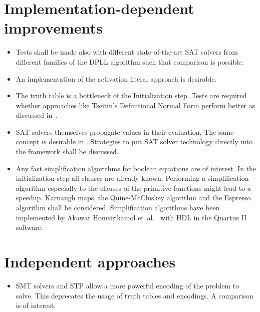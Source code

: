 \section{Implementation-dependent improvements}
%
\begin{itemize}
  \item Tests shall be made also with different state-of-the-art SAT solvers from different families of the DPLL algorithm such that comparison is possible.
  \item An implementation of the activation literal approach is desirable.
  \item The truth table is a bottleneck of the Initialization step. Tests are required whether approaches like Tseitin's Definitional Normal Form perform better as discussed in~\cite{Sat03}.
  \item SAT solvers themselves propagate values in their evaluation. The same concept is desirable in \nltool. Strategies to put SAT solver technology directly into the framework shall be discussed.
  \item Any fast simplification algorithms for boolean equations are of interest. In the initialization step all clauses are already known. Performing a simplification algorithm especially to the clauses of the primitive functions might lead to a speedup. Karnaugh maps, the Quine-McCluskey algorithm and the Espresso algorithm shall be considered. Simplification algorithms have been implemented by Akawat Homsirikamol et~al.~\cite{Cry04} with HDL in the Quartus II software.
\end{itemize}

\section{Independent approaches}
%
\begin{itemize}
  \item SMT solvers and STP allow a more powerful encoding of the problem to solve. This deprecates the usage of truth tables and encodings. A comparison is of interest.
\end{itemize}
